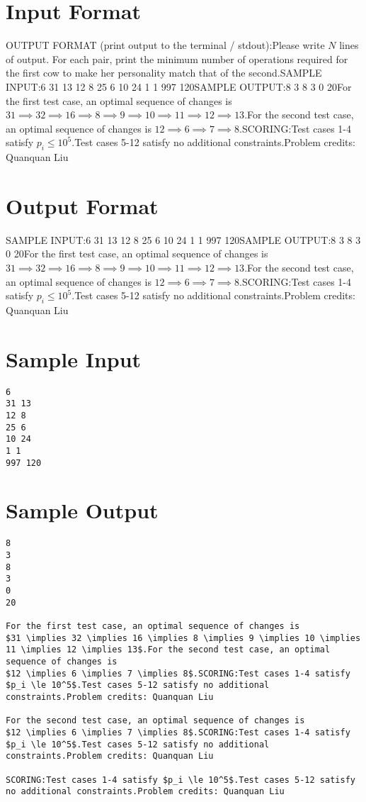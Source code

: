 \documentclass[12pt]{article}
\begin{document}
\section*{Input Format}
OUTPUT FORMAT (print output to the terminal / stdout):Please write $N$ lines of output.  For each pair, print the minimum number of
operations required  for the first cow to make her personality match that of the
second.SAMPLE INPUT:6
31 13
12 8
25 6
10 24
1 1
997 120SAMPLE OUTPUT:8
3
8
3
0
20For the first test case, an optimal sequence of changes is
$31 \implies 32 \implies 16 \implies 8 \implies 9 \implies 10 \implies 11 \implies 12 \implies 13$.For the second test case, an optimal sequence of changes is
$12 \implies 6 \implies 7 \implies 8$.SCORING:Test cases 1-4 satisfy $p_i \le 10^5$.Test cases 5-12 satisfy no additional constraints.Problem credits: Quanquan Liu

\section*{Output Format}
SAMPLE INPUT:6
31 13
12 8
25 6
10 24
1 1
997 120SAMPLE OUTPUT:8
3
8
3
0
20For the first test case, an optimal sequence of changes is
$31 \implies 32 \implies 16 \implies 8 \implies 9 \implies 10 \implies 11 \implies 12 \implies 13$.For the second test case, an optimal sequence of changes is
$12 \implies 6 \implies 7 \implies 8$.SCORING:Test cases 1-4 satisfy $p_i \le 10^5$.Test cases 5-12 satisfy no additional constraints.Problem credits: Quanquan Liu

\section*{Sample Input}
\begin{verbatim}
6
31 13
12 8
25 6
10 24
1 1
997 120
\end{verbatim}

\section*{Sample Output}
\begin{verbatim}
8
3
8
3
0
20

For the first test case, an optimal sequence of changes is
$31 \implies 32 \implies 16 \implies 8 \implies 9 \implies 10 \implies 11 \implies 12 \implies 13$.For the second test case, an optimal sequence of changes is
$12 \implies 6 \implies 7 \implies 8$.SCORING:Test cases 1-4 satisfy $p_i \le 10^5$.Test cases 5-12 satisfy no additional constraints.Problem credits: Quanquan Liu

For the second test case, an optimal sequence of changes is
$12 \implies 6 \implies 7 \implies 8$.SCORING:Test cases 1-4 satisfy $p_i \le 10^5$.Test cases 5-12 satisfy no additional constraints.Problem credits: Quanquan Liu

SCORING:Test cases 1-4 satisfy $p_i \le 10^5$.Test cases 5-12 satisfy no additional constraints.Problem credits: Quanquan Liu
\end{verbatim}
\end{document}
